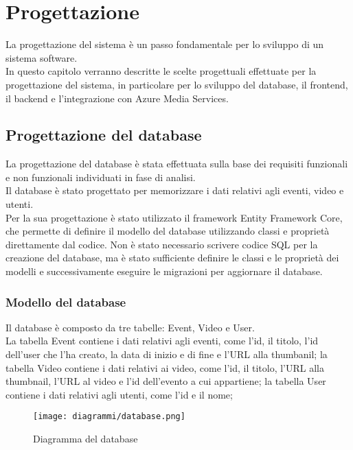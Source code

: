 \chapter{Progettazione}
\label{cap:progettazione}

La progettazione del sistema è un passo fondamentale per lo sviluppo di un sistema software.\\
In questo capitolo verranno descritte le scelte progettuali effettuate per la progettazione del sistema, in particolare per lo sviluppo del database, il frontend, il backend e l'integrazione con Azure Media Services.\\
\section{Progettazione del database}
La progettazione del database è stata effettuata sulla base dei requisiti funzionali e non funzionali individuati in fase di analisi.\\
Il database è stato progettato per memorizzare i dati relativi agli eventi, video e utenti.\\
Per la sua progettazione è stato utilizzato il framework Entity Framework Core, che permette di definire il modello del database utilizzando classi e proprietà direttamente dal codice. Non è stato necessario scrivere codice SQL per la creazione del database, ma è stato sufficiente definire le classi e le proprietà dei modelli e successivamente eseguire le migrazioni per aggiornare il database.\\

\clearpage

\subsection{Modello del database}
Il database è composto da tre tabelle: Event, Video e User.\\
La tabella Event contiene i dati relativi agli eventi, come l'id, il titolo, l'id dell'user che l'ha creato, la data di inizio e di fine e l'URL alla thumbanil; la tabella Video contiene i dati relativi ai video, come l'id, il titolo, l'URL alla thumbnail, l'URL al video e l'id dell'evento a cui appartiene; la tabella User contiene i dati relativi agli utenti, come l'id e il nome;

\begin{figure}[H] 
    \centering 
    \texttt{[image: diagrammi/database.png]} 
    \caption{Diagramma del database}
\end{figure}

